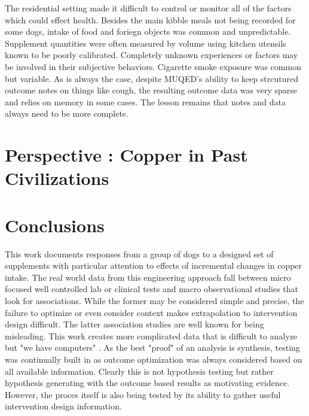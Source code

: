 The residential setting made it difficult to control or monitor
all of the factors which could effect health. Besides the main
kibble meals not being recorded for some dogs, intake of food
and foriegn objects was common and unpredictable. 
Supplement quantities were often measured by volume using kitchen
utensils known to be poorly calibrated. 
Completely unknown experiences or factors may be involved in their
subjective behaviors.  Cigarette smoke exposure was common
but variable.
As is always the case, despite MUQED's ability to keep strcutured
outcome notes on things like cough, the resulting outcome
data was very sparse and relies on memory in some cases.
The lesson remains that notes and data always need to be
more complete. 


\section{Perspective : Copper in Past Civilizations }








\section{Conclusions}



This work documents responses from  a group of dogs to a designed
set of supplements with particular attention to effects of incremental
changes in copper intake.  The real world data from this engineering
approach fall between micro focused well controlled lab or clinical
tests and macro observational studies that look for associations.
While the former may be considered simple and precise, the failure to optimize or
even consider context makes extrapolation to intervention design difficult.
The latter association studies are well known for being misleading.
This work creates more complicated data that is difficult to analyze
but "we have computers"  .  
As the best "proof" of an analysis is synthesis, testing was continually
built in as outcome optimization was always considered based on 
all available information. Clearly this is not hypothesis testing but
rather hypothesis generating with the outcome based results as 
motivating evidence. However, the proces itself is also being tested
by its ability to gather useful intervention design information.  


